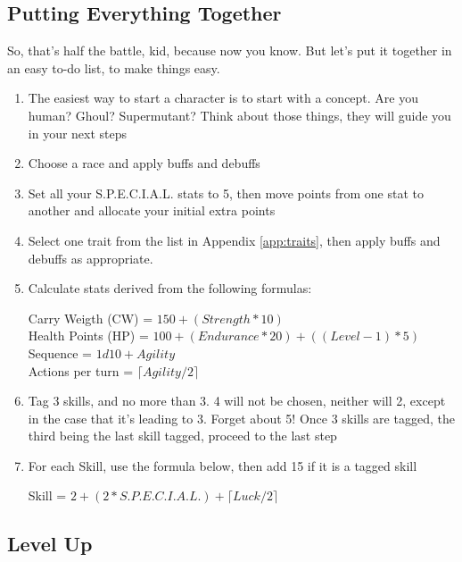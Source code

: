 \documentclass[11pt]{article} %
\begin{document}
\subsection{Putting Everything Together}

So, that's half the battle, kid, because now you know. But let's put it together in an easy to-do list, to make things easy.

\begin{enumerate}
	\item The easiest way to start a character is to start with a concept. Are you human? Ghoul? Supermutant? Think about those things, they will guide you in your next steps
	\item Choose a race and apply buffs and debuffs
	\item Set all your S.P.E.C.I.A.L. stats to 5, then move points from one stat to another and allocate your initial extra points
	\item Select one trait from the list in Appendix \ref{app:traits}, then apply buffs and debuffs as appropriate. 
	\item Calculate stats derived from the following formulas:
	
		\begin{center}
			Carry Weigth (CW) = $150 + (Strength * 10)$ \\
			Health Points (HP) = $100 + (Endurance * 20) + ((Level - 1) * 5)$ \\
			Sequence = $1d10 + Agility$ \\
			Actions per turn = $ \lceil Agility / 2 \rceil $
		\end{center}
	
	\item Tag 3 skills, and no more than 3. 4 will not be chosen, neither will 2, except in the case that it's leading to 3. Forget about 5! Once 3 skills are tagged, the third being the last skill tagged, proceed to the last step
	\item For each Skill, use the formula below, then add 15 if it is a tagged skill

		\begin{center}
			Skill = $2 + (2 * S.P.E.C.I.A.L.) + \lceil Luck / 2 \rceil$
		\end{center}
\end{enumerate}

\subsection{Level Up} 
\end{document}

